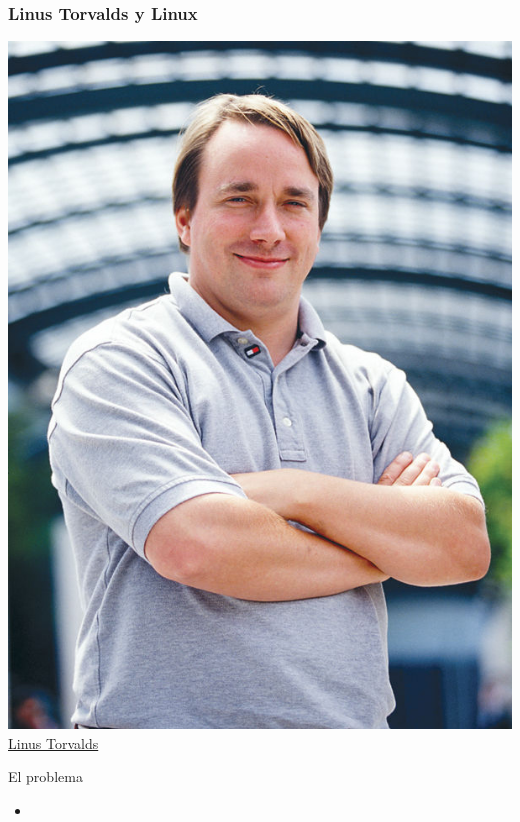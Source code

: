 \documentclass[hyperref={colorlinks}]{beamer}
\begin{document}
\begin{frame}
    \frametitle{Linus Torvalds y Linux}

    \begin{minipage}{.4\linewidth}
        \includegraphics[width=.9\linewidth]{figs/torvalds.jpeg}\\
        \centering\href{https://es.wikipedia.org/wiki/Linus_Torvalds}{Linus Torvalds}
    \end{minipage}
    \begin{minipage}{.55\linewidth}
        \begin{block}{El problema}
            \begin{itemize}
                \item

\end{itemize}
\end{block}
\end{minipage}
\end{frame}
\end{document}
